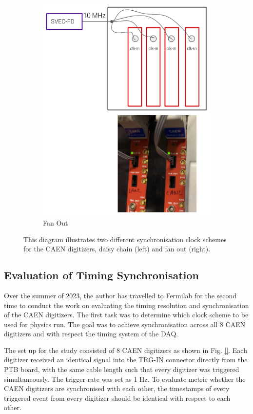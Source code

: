 \begin{figure}[htbp!]
\begin{subfigure}[h]{0.49\linewidth}
\includegraphics[width=\linewidth]{fanout}
\caption{Fan Out}
\end{subfigure}%
\caption{
This diagram illustrates two different synchronisation clock schemes for the CAEN digitizers, daisy chain (left) and fan out (right).
}
\label{fig:clock_scheme}
\end{figure}

\subsection{Evaluation of Timing Synchronisation}
\label{section5.4.2}
Over the summer of 2023, the author has travelled to Fermilab for the second time to conduct the work on evaluating the timing resolution and synchronisation of the CAEN digitizers.
The first task was to determine which clock scheme to be used for physics run. 
The goal was to achieve synchronisation across all 8 CAEN digitizers and with respect the timing system of the DAQ.

The set up for the study consisted of 8 CAEN digitizers as shown in Fig. \ref{}. 
Each digitizer received an identical signal into the TRG-IN connector directly from the PTB board, with the same cable length such that every digitizer was triggered simultaneously.
The trigger rate was set as 1 Hz.
To evaluate metric whether the CAEN digitizers are synchronised with each other, the timestamps of every triggered event from every digitizer should be identical with respect to each other. 

